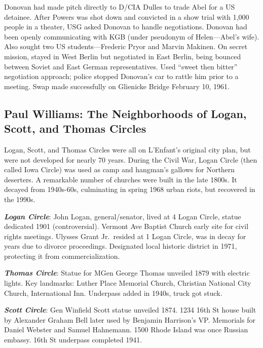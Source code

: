 \documentclass[
]{article}
\begin{document}
Donovan had made pitch directly to D/CIA Dulles to trade Abel for a US
detainee. After Powers was shot down and convicted in a show trial with
1,000 people in a theater, USG asked Donovan to handle negotiations.
Donovan had been openly communicating with KGB (under pseudonym of
Helen---Abel's wife). Also sought two US students---Frederic Pryor and
Marvin Makinen. On secret mission, stayed in West Berlin but negotiated
in East Berlin, being bounced between Soviet and East German
representatives. Used ``sweet then bitter'' negotiation approach; police
stopped Donovan's car to rattle him prior to a meeting. Swap made
successfully on Glienicke Bridge February 10, 1961.

\hypertarget{paul-williams-the-neighborhoods-of-logan-scott-and-thomas-circles}{%
\subsection{Paul Williams: The Neighborhoods of Logan, Scott, and Thomas
Circles}\label{paul-williams-the-neighborhoods-of-logan-scott-and-thomas-circles}}

Logan, Scott, and Thomas Circles were all on L'Enfant's original city
plan, but were not developed for nearly 70 years. During the Civil War,
Logan Circle (then called Iowa Circle) was used as camp and hangman's
gallows for Northern deserters. A remarkable number of churches were
built in the late 1800s. It decayed from 1940s-60s, culminating in
spring 1968 urban riots, but recovered in the 1990s.

\textbf{\emph{Logan Circle}}: John Logan, general/senator, lived at 4
Logan Circle, statue dedicated 1901 (controversial). Vermont Ave Baptist
Church early site for civil rights meetings. Ulysses Grant Jr.~resided
at 1 Logan Circle, was in decay for years due to divorce proceedings.
Designated local historic district in 1971, protecting it from
commercialization.

\textbf{\emph{Thomas Circle}}: Statue for MGen George Thomas unveiled
1879 with electric lights. Key landmarks: Luther Place Memorial Church,
Christian National City Church, International Inn. Underpass added in
1940s, truck got stuck.

\textbf{\emph{Scott Circle}}: Gen Winfield Scott statue unveiled 1874.
1234 16th St house built by Alexander Graham Bell later used by Benjamin
Harrison's VP. Memorials for Daniel Webster and Samuel Hahnemann. 1500
Rhode Island was once Russian embassy. 16th St underpass completed 1941.
\end{document}
